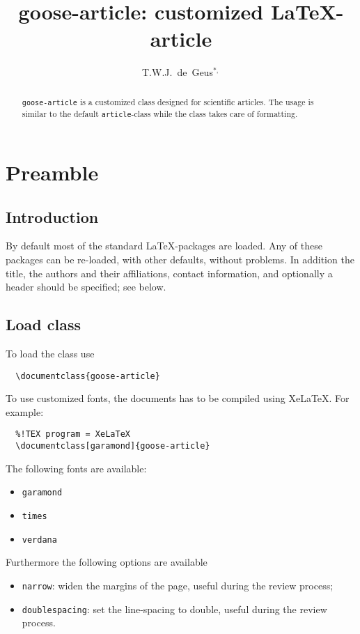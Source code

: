 \documentclass[garamond,namecite]{goose-article}
\title{%
  goose-article: customized \LaTeX-article
}
\author[1]{T.W.J.~de~Geus$^{*,}$}
\affil[1]{
  Physics Institute \nl
  \'{E}cole Polytechnique F\'{e}d\'{e}rale de Lausanne (EPFL) \nl
  Switzerland
}
\begin{document}
\maketitle

\begin{abstract}
\texttt{goose-article} is a customized class designed for scientific articles. The usage is similar to the default \texttt{article}-class while the class takes care of formatting.
\end{abstract}


\section{Preamble}

\subsection{Introduction}

By default most of the standard \LaTeX-packages are loaded. Any of these packages can be re-loaded, with other defaults, without problems. In addition the title, the authors and their affiliations, contact information, and optionally a header should be specified; see below.

\subsection{Load class}

To load the class use
%
\begin{verbatim}
  \documentclass{goose-article}
\end{verbatim}
%
To use customized fonts, the documents has to be compiled using XeLaTeX. For example:
%
\begin{verbatim}
  %!TEX program = XeLaTeX
  \documentclass[garamond]{goose-article}
\end{verbatim}
%
The following fonts are available:
%
\begin{itemize}
  \item \texttt{garamond}
  \item \texttt{times}
  \item \texttt{verdana}
\end{itemize}
%
Furthermore the following options are available
%
\begin{itemize}
  \item \texttt{narrow}: widen the margins of the page, useful during the review process;
  \item \texttt{doublespacing}: set the line-spacing to double, useful during the review process.
\end{itemize}
%
\end{document}
